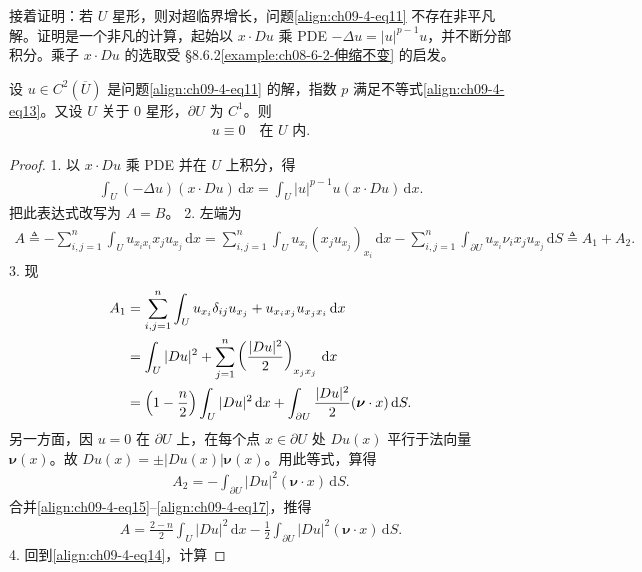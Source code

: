 \documentclass[../../main.tex]{subfiles}
\begin{document}
接着证明：若 $U$ 星形，则对超临界增长，问题\eqref{align:ch09-4-eq11} 不存在非平凡解。证明是一个非凡的计算，起始以 $x\cdot Du$ 乘 PDE $-\Delta u=|u|^{p-1}u$，并不断分部积分。乘子 $x\cdot Du$ 的选取受 \S8.6.2\cref{example:ch08-6-2-伸缩不变} 的启发。

\begin{theorem}[非平凡解的不存在性]\label{theorem:ch09-4-3-非平凡解不存在}
设 $u\in C^2(\overline{U})$ 是问题\eqref{align:ch09-4-eq11} 的解，指数 $p$ 满足不等式\eqref{align:ch09-4-eq13}。又设 $U$ 关于 $0$ 星形，$\partial U$ 为 $C^1$。则
\begin{align*}
u\equiv 0\quad\text{在 }U\text{ 内}.
\end{align*}
\begin{proof}
1. 以 $x\cdot Du$ 乘 PDE 并在 $U$ 上积分，得
\begin{align}
\int_U(-\Delta u)(x\cdot Du)\,\mathrm{d}x=\int_U|u|^{p-1}u(x\cdot Du)\,\mathrm{d}x.\label{align:ch09-4-eq14}
\end{align}
把此表达式改写为 $A=B$。
2. 左端为
\begin{align}
A\triangleq-\sum_{i,j=1}^n\int_U u_{x_ix_i}x_ju_{x_j}\,\mathrm{d}x=\sum_{i,j=1}^n\int_U u_{x_i}(x_ju_{x_j})_{x_i}\,\mathrm{d}x-\sum_{i,j=1}^n\int_{\partial U}u_{x_i}\nu_ix_ju_{x_j}\,\mathrm{d}S\triangleq A_1+A_2.\label{align:ch09-4-eq15}
\end{align}
3. 现
\begin{align}
A_1&=\sum_{i,j=1}^n\int_U u_{x_i}\delta_{ij}u_{x_j}+u_{x_ix_j}u_{x_jx_i}\,\mathrm{d}x\notag\\
&=\int_U|Du|^2+\sum_{j=1}^n\left(\frac{|Du|^2}{2}\right)_{x_jx_j}\,\mathrm{d}x\notag\\
&=\left(1-\frac n2\right)\int_U|Du|^2\,\mathrm{d}x+\int_{\partial U}\frac{|Du|^2}{2}(\boldsymbol{\nu}\cdot x)\,\mathrm{d}S.\label{align:ch09-4-eq16}
\end{align}
另一方面，因 $u=0$ 在 $\partial U$ 上，在每个点 $x\in\partial U$ 处 $Du(x)$ 平行于法向量 $\boldsymbol{\nu}(x)$。故 $Du(x)=\pm|Du(x)|\boldsymbol{\nu}(x)$。用此等式，算得
\begin{align}
A_2=-\int_{\partial U}|Du|^2(\boldsymbol{\nu}\cdot x)\,\mathrm{d}S.\label{align:ch09-4-eq17}
\end{align}
合并\eqref{align:ch09-4-eq15}--\eqref{align:ch09-4-eq17}，推得
\begin{align*}
A=\frac{2-n}{2}\int_U|Du|^2\,\mathrm{d}x-\frac12\int_{\partial U}|Du|^2(\boldsymbol{\nu}\cdot x)\,\mathrm{d}S.
\end{align*}
4. 回到\eqref{align:ch09-4-eq14}，计算

\end{proof}
\end{theorem}
\end{document}
